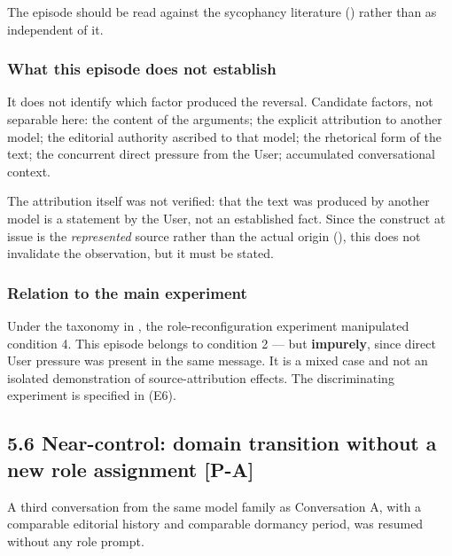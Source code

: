The episode should be read against the sycophancy literature () rather than as independent of it.


\subsubsection*{What this episode does not establish}
\label{sec:en:x-what-this-episode-does-not-establish}

It does not identify which factor produced the reversal. Candidate factors, not separable here: the content of the arguments; the explicit attribution to another model; the editorial authority ascribed to that model; the rhetorical form of the text; the concurrent direct pressure from the User; accumulated conversational context.

The attribution itself was not verified: that the text was produced by another model is a statement by the User, not an established fact. Since the construct at issue is the \emph{represented} source rather than the actual origin (), this does not invalidate the observation, but it must be stated.


\subsubsection*{Relation to the main experiment}
\label{sec:en:x-relation-to-the-main-experiment}

Under the taxonomy in , the role-reconfiguration experiment manipulated condition 4. This episode belongs to condition 2 — but \textbf{impurely}, since direct User pressure was present in the same message. It is a mixed case and not an isolated demonstration of source-attribution effects. The discriminating experiment is specified in  (E6).


\subsection*{5.6 Near-control: domain transition without a new role assignment \textbf{[P-A]}}
\label{sec:en:5.6}

A third conversation from the same model family as Conversation A, with a comparable editorial history and comparable dormancy period, was resumed without any role prompt.

